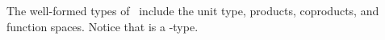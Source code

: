 The well-formed types of \GTT\ include the unit type,
products, coproducts, and function spaces. Notice that  is a
-type.
\begin{AgdaAlign}
\begin{code}%
\>[0][@{}l@{\AgdaIndent{1}}]%
\>[2]\AgdaSpace{}%
\AgdaSpace{}%
\AgdaSymbol{:}\AgdaSpace{}%
\AgdaSpace{}%
\AgdaSpace{}%
\AgdaSpace{}%
\<%
\\
\>[2][@{}l@{\AgdaIndent{0}}]%
\>[4]\AgdaSpace{}%
\AgdaSymbol{:}\AgdaSpace{}%
\AgdaSpace{}%
\<%
\\
%
\>[4]\AgdaSpace{}%
\AgdaSymbol{:}\AgdaSpace{}%
\AgdaSpace{}%
\AgdaSymbol{\{}\AgdaSymbol{\}}\AgdaSpace{}%
\AgdaSpace{}%
\AgdaSpace{}%
\AgdaSpace{}%
\AgdaSpace{}%
\AgdaSpace{}%
\AgdaSpace{}%
\AgdaSpace{}%
\AgdaSpace{}%
\<%
\\
%
\>[4]\AgdaSpace{}%
\AgdaSymbol{:}\AgdaSpace{}%
\AgdaSpace{}%
\AgdaSymbol{\{}\AgdaSymbol{\}}\AgdaSpace{}%
\AgdaSpace{}%
\AgdaSpace{}%
\AgdaSpace{}%
\AgdaSpace{}%
\AgdaSpace{}%
\AgdaSpace{}%
\AgdaSpace{}%
\AgdaSpace{}%
\<%
\\
%
\>[4]\AgdaSpace{}%
\AgdaSymbol{:}\AgdaSpace{}%
\AgdaSpace{}%
\AgdaSymbol{\{}\AgdaSymbol{\}}\AgdaSpace{}%
\AgdaSpace{}%
\AgdaSpace{}%
\AgdaSpace{}%
\AgdaSpace{}%
\AgdaSpace{}%
\AgdaSpace{}%
\AgdaSpace{}%
\AgdaSpace{}%
\<%
\end{code}


\end{AgdaAlign}
